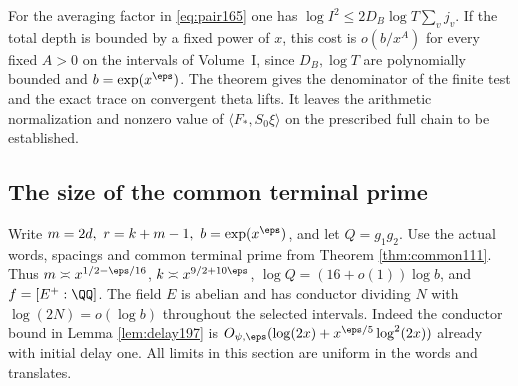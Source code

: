 \documentclass[a4paper,11pt]{article}
\theoremstyle{definition}
\theoremstyle{remark}
\numberwithin{equation}{section}
\begin{document}
For the averaging factor in \eqref{eq:pair165} one has
\(\log I^2\le 2 D_B\log T\sum_v j_v\). If the total depth is
bounded by a fixed power of \(x\), this cost is \(o(b/x^A)\)
for every fixed \(A>0\) on the intervals of Volume~I, since
\(D_B,\log T\) are polynomially bounded and \(b=\exp(x^\eps)\).
The theorem gives the denominator of the finite test and the
exact trace on convergent theta lifts. It leaves the arithmetic
normalization and nonzero value of \(\langle F_*,S_0\xi\rangle\)
on the prescribed full chain to be established.

\subsection{The size of the common terminal prime}\label{nav:VII-14}
\label{sec:terminal209}

Write \(m=2d,\ r=k+m-1,\ b=\exp(x^\eps)\), and let
\(Q=g_1g_2\). Use the actual words, spacings and common
terminal prime from Theorem \ref{thm:common111}. Thus \(m\asymp x^{1/2-\eps/16}\),
\(k\asymp x^{9/2+10\eps}\), \(\log Q=(16+o(1))\log b\),
and \(f=[E^+:\QQ]\). The field \(E\) is abelian and has conductor
dividing \(N\) with \(\log(2N)=o(\log b)\) throughout the selected
intervals. Indeed the conductor bound in
Lemma \ref{lem:delay197}
is \(O_{\psi,\eps}(\log(2x)+x^{\eps/5}\log^2(2x))\) already
with initial delay one. All limits in this section are uniform in
the words and translates.
\end{document}

